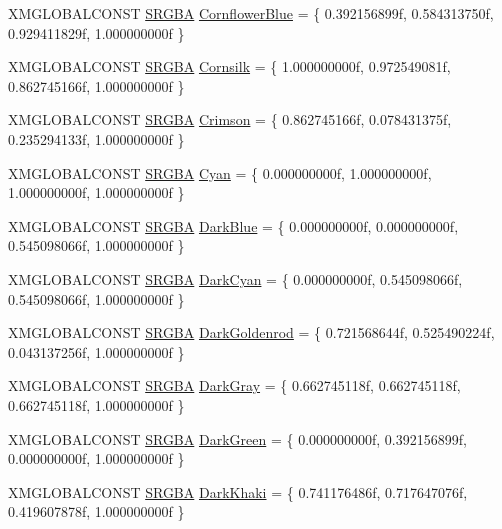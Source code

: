 \begin{DoxyCompactItemize}
X\+M\+G\+L\+O\+B\+A\+L\+C\+O\+N\+ST \hyperlink{structmage_1_1_s_r_g_b_a}{S\+R\+G\+BA} \hyperlink{namespacemage_1_1color_a997d86bad53f38d8203cd447b7d6ecf5}{Cornflower\+Blue} = \{ 0.\+392156899f, 0.\+584313750f, 0.\+929411829f, 1.\+000000000f \}
\item 
X\+M\+G\+L\+O\+B\+A\+L\+C\+O\+N\+ST \hyperlink{structmage_1_1_s_r_g_b_a}{S\+R\+G\+BA} \hyperlink{namespacemage_1_1color_abd04686fadc4f619295a312daecf0b49}{Cornsilk} = \{ 1.\+000000000f, 0.\+972549081f, 0.\+862745166f, 1.\+000000000f \}
\item 
X\+M\+G\+L\+O\+B\+A\+L\+C\+O\+N\+ST \hyperlink{structmage_1_1_s_r_g_b_a}{S\+R\+G\+BA} \hyperlink{namespacemage_1_1color_abc19ee500228a105fe49c5ca24cfe98e}{Crimson} = \{ 0.\+862745166f, 0.\+078431375f, 0.\+235294133f, 1.\+000000000f \}
\item 
X\+M\+G\+L\+O\+B\+A\+L\+C\+O\+N\+ST \hyperlink{structmage_1_1_s_r_g_b_a}{S\+R\+G\+BA} \hyperlink{namespacemage_1_1color_a56474d8e830aab2eaca9bcb8a14a7754}{Cyan} = \{ 0.\+000000000f, 1.\+000000000f, 1.\+000000000f, 1.\+000000000f \}
\item 
X\+M\+G\+L\+O\+B\+A\+L\+C\+O\+N\+ST \hyperlink{structmage_1_1_s_r_g_b_a}{S\+R\+G\+BA} \hyperlink{namespacemage_1_1color_a54cb89c27cd5fe8934aa1b49ee79ea3b}{Dark\+Blue} = \{ 0.\+000000000f, 0.\+000000000f, 0.\+545098066f, 1.\+000000000f \}
\item 
X\+M\+G\+L\+O\+B\+A\+L\+C\+O\+N\+ST \hyperlink{structmage_1_1_s_r_g_b_a}{S\+R\+G\+BA} \hyperlink{namespacemage_1_1color_ac0be520fcdc0da71755c6f202d763b4f}{Dark\+Cyan} = \{ 0.\+000000000f, 0.\+545098066f, 0.\+545098066f, 1.\+000000000f \}
\item 
X\+M\+G\+L\+O\+B\+A\+L\+C\+O\+N\+ST \hyperlink{structmage_1_1_s_r_g_b_a}{S\+R\+G\+BA} \hyperlink{namespacemage_1_1color_a2823510fdf69efc81864c1b42c875c93}{Dark\+Goldenrod} = \{ 0.\+721568644f, 0.\+525490224f, 0.\+043137256f, 1.\+000000000f \}
\item 
X\+M\+G\+L\+O\+B\+A\+L\+C\+O\+N\+ST \hyperlink{structmage_1_1_s_r_g_b_a}{S\+R\+G\+BA} \hyperlink{namespacemage_1_1color_a49c50e740fe28a79fd2235907247d452}{Dark\+Gray} = \{ 0.\+662745118f, 0.\+662745118f, 0.\+662745118f, 1.\+000000000f \}
\item 
X\+M\+G\+L\+O\+B\+A\+L\+C\+O\+N\+ST \hyperlink{structmage_1_1_s_r_g_b_a}{S\+R\+G\+BA} \hyperlink{namespacemage_1_1color_a07927c32593810cc4c48334cbd3fde8a}{Dark\+Green} = \{ 0.\+000000000f, 0.\+392156899f, 0.\+000000000f, 1.\+000000000f \}
\item 
X\+M\+G\+L\+O\+B\+A\+L\+C\+O\+N\+ST \hyperlink{structmage_1_1_s_r_g_b_a}{S\+R\+G\+BA} \hyperlink{namespacemage_1_1color_af67bbefc1beb8e24c062e492d78b2cc0}{Dark\+Khaki} = \{ 0.\+741176486f, 0.\+717647076f, 0.\+419607878f, 1.\+000000000f \}

\end{DoxyCompactItemize}

